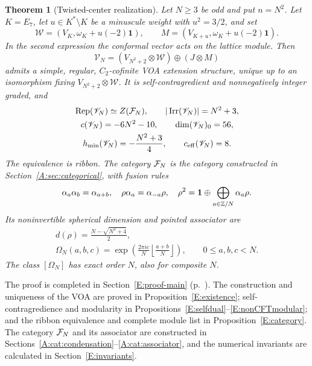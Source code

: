 \documentclass[11pt]{article}
\newtheorem{theorem}{Theorem}[section]
\newcommand{\one}{\mathbf1}\newcommand{\D}{\mathcal D}\newcommand{\Dcat}{\mathcal D}
\numberwithin{equation}{section}
\begin{document}
\begin{theorem}[Twisted-center realization]\label{E:main}
Let $N\geq3$ be odd and put $n=N^2$. Let $K=E_7$, let $u\in K^*\setminus K$ be a minuscule weight with $u^2=3/2$, and set
\[
\mathcal W=(V_K,\omega_K+u(-2)\one),\qquad
M=(V_{K+u},\omega_K+u(-2)\one).
\]
In the second expression the conformal vector acts on the lattice module. Then
\begin{equation}\label{E:def}
\mathscr{V}_N=(V_{N^2+2}\otimes \mathcal W)\oplus(J\otimes M)
\end{equation}
admits a simple, regular, $C_2$-cofinite VOA extension structure, unique up to an isomorphism fixing $V_{N^2+2}\otimes \mathcal W$. It is self-contragredient and nonnegatively integer graded, and
\begin{equation}\label{E:maininvariants}
\begin{gathered}
\operatorname{Rep}(\mathscr{V}_N)\simeq Z(\mathcal F_N),\qquad |\operatorname{Irr}(\mathscr{V}_N)|=N^2+3,\\
c(\mathscr{V}_N)=-6N^2-10,\qquad \dim(\mathscr{V}_N)_0=56,\\
h_{\min}(\mathscr{V}_N)=-\frac{N^2+3}{4},\qquad c_{\mathrm{eff}}(\mathscr{V}_N)=8.
\end{gathered}
\end{equation}
The equivalence is ribbon. The category $\mathcal F_N$ is the category constructed in Section~\ref{A:sec:categorical}, with fusion rules
\[
\alpha_a\alpha_b=\alpha_{a+b},\quad
\rho\alpha_a=\alpha_{-a}\rho,\quad
\rho^2=\one\oplus\bigoplus_{a\in\Z/N}\alpha_a\rho.
\]
Its noninvertible spherical dimension and pointed associator are
\begin{equation}\label{E:HIinvariants}
\begin{gathered}
d(\rho)=\frac{N-\sqrt{N^2+4}}2,\\
\Omega_N(a,b,c)=\exp\!\left(\frac{2\pi i c}{N}
\left\lfloor\frac{a+b}{N}\right\rfloor\right),\qquad 0\leq a,b,c<N.
\end{gathered}
\end{equation}
The class $[\Omega_N]$ has exact order $N$, also for composite $N$.
\end{theorem}

The proof is completed in Section~\ref{E:proof-main} (p.~\pageref{E:proof-main}). The construction and uniqueness of the VOA are proved in Proposition~\ref{E:existence}; self-contragredience and modularity in Propositions~\ref{E:selfdual}--\ref{E:nonCFTmodular}; and the ribbon equivalence and complete module list in Proposition~\ref{E:category}. The category $\mathcal F_N$ and its associator are constructed in Sections~\ref{A:cat:condensation}--\ref{A:cat:associator}, and the numerical invariants are calculated in Section~\ref{E:invariants}.
\end{document}
